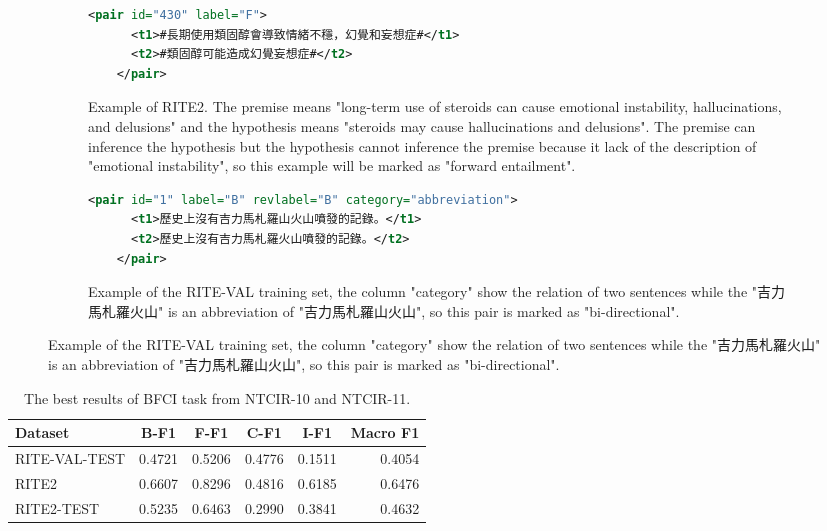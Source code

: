 \documentclass[12pt]{article}
\begin{document}
\begin{CJK*}{UTF8}{bkai}
\begin{spacing}{1.77}
\begin{figure}[ht!]
  \centering
  \caption{The examples of RITE2 and RITE-VAL}
  \begin{subfigure}{1\linewidth}
    \caption{Example of RITE2. The premise means "long-term use of steroids can cause emotional instability, hallucinations, and delusions" and the hypothesis means "steroids may cause hallucinations and delusions". The premise can inference the hypothesis but the hypothesis cannot inference the premise because it lack of the description of "emotional instability", so this example will be marked as "forward entailment".}
    \begin{minipage}{\linewidth}
    \begin{lstlisting}[language=XML]
    <pair id="430" label="F">
      <t1>#長期使用類固醇會導致情緒不穩，幻覺和妄想症#</t1>
      <t2>#類固醇可能造成幻覺妄想症#</t2>
    </pair>
    \end{lstlisting}
    \end{minipage}
  \end{subfigure}

  \begin{subfigure}{1\linewidth}
    \caption{Example of the RITE-VAL training set, the column "category" show the relation of two sentences while the "吉力馬札羅火山" is an abbreviation of "吉力馬札羅山火山", so this pair is marked as "bi-directional".}
    \begin{minipage}{\linewidth}
    \begin{lstlisting}[language=XML]
    <pair id="1" label="B" revlabel="B" category="abbreviation">
      <t1>歷史上沒有吉力馬札羅山火山噴發的記錄。</t1>
      <t2>歷史上沒有吉力馬札羅火山噴發的記錄。</t2>
    </pair>
    \end{lstlisting}
    \end{minipage}
  \end{subfigure}
\end{figure}


\begin{table}[H]
  \centering
  \setlength{\extrarowheight}{-3pt}
  \begin{tabular}{|l|r|r|r|r|r|}
  \hline
   Dataset & \multicolumn{1}{c|}{B-F1} & \multicolumn{1}{c|}{F-F1} & \multicolumn{1}{c|}{C-F1} & \multicolumn{1}{c|}{I-F1} & \multicolumn{1}{c|}{Macro F1} \\ \hline
  RITE-VAL-TEST & 0.4721 & 0.5206 & 0.4776 & 0.1511 & 0.4054 \\ \hline
  RITE2 & 0.6607 & 0.8296 & 0.4816 & 0.6185 & 0.6476 \\ \hline
  RITE2-TEST & 0.5235 & 0.6463 & 0.2990 & 0.3841 & 0.4632 \\ \hline
  \end{tabular}
  \caption{The best results of BFCI task from NTCIR-10 and NTCIR-11.}
  \label{result:bfci_ntcir}
\end{table}


\end{spacing}
\end{CJK*}
\end{document}
